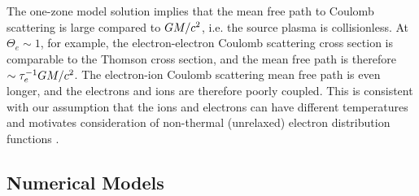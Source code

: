The one-zone model solution implies that the mean free path to Coulomb scattering is large compared to $GM/c^2$, i.e. the source plasma is collisionless.
At $\Theta_e \sim 1$, for example, the electron-electron Coulomb scattering cross section is comparable to the Thomson cross section, and the mean free path is therefore $\sim \tau_e^{-1} GM/c^2$.
The electron-ion Coulomb scattering mean free path is even longer, and the electrons and ions are therefore poorly coupled.
This is consistent with our assumption that the ions and electrons can have different temperatures  \citep{1976ApJ...204..187S,1977ApJ...214..840I, 1982Natur.295...17R} and motivates consideration of non-thermal (unrelaxed) electron distribution functions \citep[see][]{2000ApJ...541..234O, 2009ApJ...701..521C, 2014A&A...570A...7M, 2018A&A...612A..34D, 2021arXiv211102518F, 2021NatAs.tmp..218C, Chatterjee2021, 2021arXiv211203933E, Scepi2021}.

\subsection{Numerical Models}

